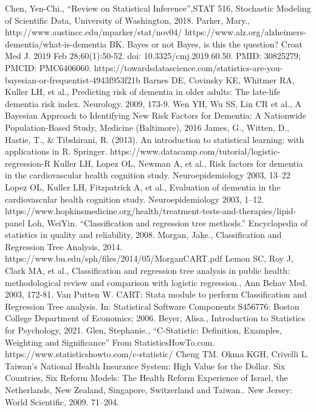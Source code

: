 \documentclass[12pt,letterpaper]{article}
\begin{document}
\begin{thebibliography}{}
 Chen, Yen-Chi., ``Review on Statistical Inference'',STAT 516, Stochastic Modeling of Scientific Data, University of Washington, 2018. 
 Parker, Mary., http://www.austincc.edu/mparker/stat/nov04/
 https://www.alz.org/alzheimers-dementia/what-is-dementia
  BK. Bayes or not Bayes, is this the question? Croat Med J. 2019 Feb 28;60(1):50-52. doi: 10.3325/cmj.2019.60.50. PMID: 30825279; PMCID: PMC6406060.
 https://towardsdatascience.com/statistics-are-you-bayesian-or-frequentist-4943f953f21b
 Barnes DE, Covinsky KE, Whitmer RA, Kuller LH, et al., Predicting risk of dementia in older adults: The late-life dementia risk index. Neurology. 2009, 173-9.
 Wen YH, Wu SS, Lin CR et al., A Bayesian Approach to Identifying New Risk Factors for Dementia: A Nationwide Population-Based Study, Medicine (Baltimore), 2016
 James, G., Witten, D., Hastie, T., \& Tibshirani, R. (2013). An introduction to statistical learning: with applications in R. Springer.
 https://www.datacamp.com/tutorial/logistic-regression-R
 Kuller LH, Lopez OL, Newman A, et al., Risk factors for dementia in the cardiovascular health cognition study. Neuroepidemiology 2003, 13–22
 Lopez OL, Kuller LH, Fitzpatrick A, et al., Evaluation of dementia in the cardiovascular health cognition study. Neuroepidemiology 2003, 1–12.
 https://www.hopkinsmedicine.org/health/treatment-tests-and-therapies/lipid-panel
 Loh, WeiYin. “Classification and regression tree methods.” Encyclopedia of statistics in quality and reliability, 2008.
 Morgan, Jake., Classification and Regression Tree Analysis, 2014. https://www.bu.edu/sph/files/2014/05/MorganCART.pdf
 Lemon SC, Roy J, Clark MA, et al., Classification and regression tree analysis in public health: methodological review and comparison with logistic regression., Ann Behav Med. 2003, 172-81. 
 Van Putten W. CART: Stata module to perform Classification and Regression Tree analysis. In: Statistical Software Components S456776: Boston College Department of Economics; 2006.
 Beyer, Alisa., Introduction to Statistics for Psychology, 2021.
 Glen, Stephanie., ``C-Statistic: Definition, Examples, Weighting and Significance'' From StatisticsHowTo.com. https://www.statisticshowto.com/c-statistic/
  Cheng TM. Okma KGH, Crivelli L. Taiwan's National Health Insurance System: High Value for the Dollar. Six Countries, Six Reform Models: The Health Reform Experience of Israel, the Netherlands, New Zealand, Singapore, Switzerland and Taiwan.. New Jersey: World Scientific, 2009. 71–204.

\end{thebibliography}
\end{document}
